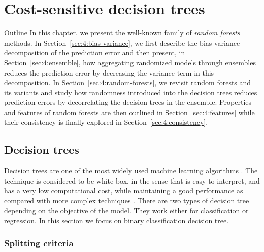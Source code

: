 \chapter{Cost-sensitive decision trees}

\begin{remark}{Outline}
In this chapter, we present the well-known family of \textit{random forests}
methods. In Section~\ref{sec:4:bias-variance}, we first describe the bias-variance
decomposition of the prediction error and then present, in
Section~\ref{sec:4:ensemble}, how aggregating randomized models through
ensembles reduces the prediction error by decreasing the variance term in this
decomposition. In Section~\ref{sec:4:random-forests}, we revisit random forests
and its variants and study how randomness introduced into the decision trees
reduces prediction errors by decorrelating the decision
trees in the ensemble. Properties and features of random forests are then outlined
in Section~\ref{sec:4:features} while their consistency
is finally explored in Section~\ref{sec:4:consistency}.
\end{remark}

\section{Decision trees}
Decision trees are one of the most widely used machine learning algorithms \citep{Lior2008}. 
The technique is considered to be white box, in the sense that is easy to interpret, and has a 
very low computational cost, while maintaining a good performance as compared with more complex 
techniques \citep{Hastie2009}. There are two types of decision tree depending on the objective of 
the model. They work either for classification or regression. In this section we focus on
binary classification decision tree.

\subsection{Splitting criteria}
 
